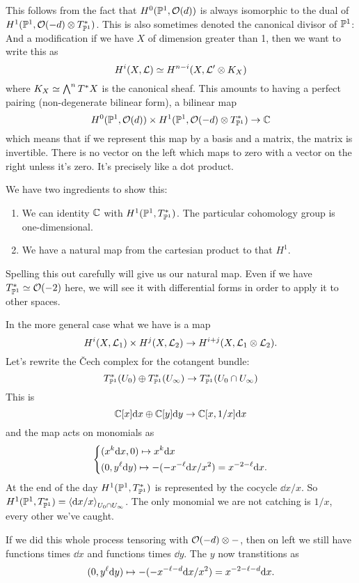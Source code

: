 \documentclass[12pt]{memoir}
\begin{document}
This follows from the fact that $H^0(\mathbb{P}^1,\mathcal{O}(d))$ is always isomorphic to the dual of $H^1(\mathbb{P}^1,\mathcal{O}(-d)\otimes T^\ast_{\mathbb{P}^1})$. This is also sometimes denoted the canonical divisor of $\mathbb{P}^1$: 
And a modification if we have $X$ of dimension greater than 1, then we want to write this as
$$H^i(X,\mathcal{L})\simeq H^{n-i}(X,\mathcal{L}'\otimes K_X)$$
where $K_X\simeq\bigwedge^nT^\ast X$ is the canonical sheaf. This amounts to having a perfect pairing (non-degenerate bilinear form), a bilinear map 
$$H^0(\mathbb{P}^1,\mathcal{O}(d))\times H^1(\mathbb{P}^1,\mathcal{O}(-d)\otimes T^\ast_{\mathbb{P}^1})\to\mathbb{C}$$
which means that if we represent this map by a basis and a matrix, the matrix is invertible. There is no vector on the left which maps to zero with a vector on the right unless it's zero. It's precisely like a dot product.\par
We have two ingredients to show this:
\begin{enumerate}
    \item We can identity $\mathbb{C}$ with $H^1(\mathbb{P}^1,T^\ast_{\mathbb{P}^1})$. The particular cohomology group is one-dimensional.
    \item We have a natural map from the cartesian product to that $H^1$.
\end{enumerate}
Spelling this out carefully will give us our natural map. Even if we have $T^\ast_{\mathbb{P}^1}\simeq\mathcal{O}(-2)$ here, we will see it with differential forms in order to apply it to other spaces.\par
In the more general case what we have is a map 
$$H^i(X,\mathcal{L}_1)\times H^j(X,\mathcal{L}_2)\to H^{i+j}(X,\mathcal{L}_1\otimes\mathcal{L}_2).$$
Let's rewrite the \v{C}ech complex for the cotangent bundle:
$$T^\ast_{\mathbb{P}^1}(U_0)\oplus T^\ast_{\mathbb{P}^1}(U_\infty)\to T^\ast_{\mathbb{P}^1}(U_0\cap U_\infty)$$
This is 
$$\mathbb{C}[x]\dd x\oplus \mathbb{C}[y]\dd y\to\mathbb{C}[x,1/x]\dd x$$
and the map acts on monomials as 
$$
\left\lbrace
\begin{aligned}
    &(x^k\dd x,0)\mapsto x^k\dd x\\
    &(0,y^\ell\dd y)\mapsto -(-x^{-\ell}\dd x/x^2)=x^{-2-\ell}\dd x.
\end{aligned}
\right.
$$
At the end of the day $H^1(\mathbb{P}^1,T^\ast_{\mathbb{P}^1})$ is represented by the cocycle $\dd x/x$. So $H^1(\mathbb{P}^1,T^\ast_{\mathbb{P}^1})=\left\langle \dd x/x\right\rangle_{U_0\cap U_\infty}$. The only monomial we are not catching is $1/x$, every other we've caught.\par
If we did this whole process tensoring with $\mathcal{O}(-d)\otimes-$, then on left we still have functions times $\dd x$ and functions times $\dd y$. The $y$ now transtitions as 
$$(0,y^\ell\dd y)\mapsto -(-x^{-\ell-d}\dd x/x^2)=x^{-2-\ell-d}\dd x.$$
\end{document}
